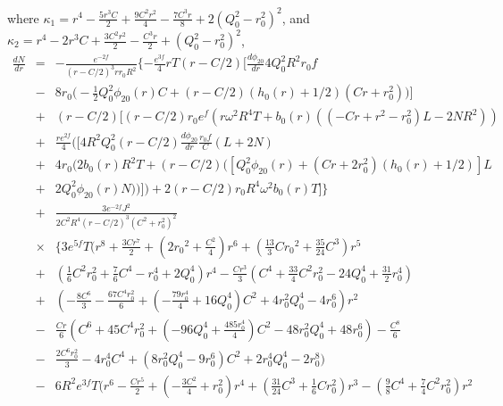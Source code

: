 \documentclass[aps,prd,12pt,superscriptaddress]{revtex4-2}
\begin{document}
where $\kappa_1 = 
r^{4}-\frac{5 r^{3} {C}}{2}+\frac{9 {C}^{2} r^{2}}{4}-\frac{7 {C}^{3} r}{8}+2 ({Q_0^2} -{r_0^2} )^{2} $, and $\kappa_2 =   r^{4}-2 r^{3} {C} +\frac{3 {C}^{2} r^{2}}{2}-\frac{{C}^{3} r}{2}
    +({Q_0^2} -{r_0^2} )^{2}$,
\begin{eqnarray}
  \frac{dN}{dr}
  &=&
    -\frac{e^{-2f}}{(r-C/2)^3 rr_0R^2}
    \{ 
-\frac{e^{3f}}{4} rT
(r-C/2)
\big[
\frac{d\phi_{20}}{dr}
4Q_0^2 R^2 
r_0f
\nonumber
\\
&-& 8 r_0
\big(-\frac{1}{2} Q_0^2 \phi_{20}(r) C  
+
(r-C/2)(h_0(r)+1/2) (Cr+r_0^2)
\big)
\big]
\nonumber
\\
&+& 
(r-C/2) 
\big[
(r-C/2)
r_0 e^{f}
(r\omega^2R^4 T
+ b_0(r)
((-Cr+r^2-r_0^2) L
-2N R^2)
)
\nonumber 
\\
&+& 
\frac{re^{2f}}{4}
\big(
[
4 R^2 Q_0^2
(r-C/2) 
\frac{d\phi_{20}}{dr}
\frac{r_0f}{C}
 (L+2N)
\nonumber
\\
&+&
4 r_0 (
2b_0(r) R^2 T 
+ (r-C/2)
([Q_0^2\phi_{20}(r)
+(Cr+2r_0^2) (h_0(r)+1/2)
]L
\nonumber 
\\
&+ &
2 Q_0^2 \phi_{20}(r) N) 
)
]
\big)
+ 2 (r-C/2) r_0R^4 \omega^2
b_0(r) T
\big]
    \} 
    \nonumber 
    \\ 
    &+& 
    \frac{3e^{-2f} J^2}
    {2C^2 R^4 (r-C/2)^3  (C^2+r_0^2)^2}
      \nonumber 
    \\ 
    &  \times &
\big\{  3 {e}^{5f} T \big(r^{8}+\frac{3 {C} r^{7}}{2}+(2 {r_0}^{2}+\frac{{C}^{2}}{4}) r^{6}
    +(\frac{13}{3} {C} {r_0}^{2}+\frac{35}{24} {C}^{3}) r^{5}
    \nonumber
    \\
    &+&
    (\frac{1}{6} {C}^{2} r_0^{2}+\frac{7}{6} {C}^{4}-r_0^{4}
    +2 Q_0^{4}) r^{4}
    -\frac{{C}r^{3}} {3} 
    ({C}^{4}+\frac{33}{4} {C}^{2} r_0^{2}-24 Q_0^{4}+\frac{31}{2} r_0^{4})
     \nonumber 
    \\
    &+&(-\frac{8 {C}^{6}}{3}-\frac{67 {C}^{4} r_0^{2}}{6}+(-\frac{79 r_0^{4}}{4}+16 Q_0^{4}) {C}^{2}+4 r_0^{2} Q_0^{4}-4 r_0^{6}) r^{2}
     \nonumber 
    \\
    &-&\frac{{C}r}{6} ({C}^{6}+45 {C}^{4} r_0^{2}+(-96 Q_0^{4}+\frac{485 r_0^{4}}{4}) {C}^{2}-48 r_0^{2} Q_0^{4}+48 r_0^{6})-\frac{{C}^{8}}{6}
     \nonumber 
    \\
    &-& \frac{2 {C}^{6} r_0^{2}}{3}-4 r_0^{4} {C}^{4}+(8 r_0^{2} Q_0^{4}-9 r_0^{6}) {C}^{2}+2 r_0^{4} Q_0^{4}-2 r_0^{8}
    \big) 
     \nonumber 
    \\
   & -& 6 
     R^2 {e}^{3f} T
    \big(r^{6}-\frac{{C} r^{5}}{2}+(-\frac{3 {C}^{2}}{4}+r_0^{2}) r^{4}+(\frac{31}{24} {C}^{3}+\frac{1}{6} {C} r_0^{2}) r^{3}-(\frac{9}{8} {C}^{4}+\frac{7}{4} {C}^{2} r_0^{2}) r^{2}

\end{eqnarray}
\end{document}
